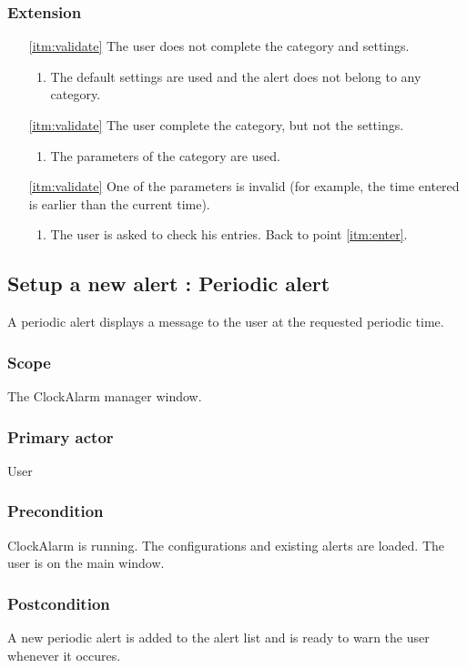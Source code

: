 \subsubsection{Extension}
\begin{enumerate}
	\item[\ref{itm:validate}] The user does not complete the category and settings.
	\begin{enumerate}[i]
		\item The default settings are used and the alert does not belong to any category.
	\end{enumerate}
	\item[\ref{itm:validate}] The user complete the category, but not the settings.
	\begin{enumerate}[i]
		\item The parameters of the category are used.
	\end{enumerate}
	\item[\ref{itm:validate}] One of the parameters is invalid (for example, the time entered is earlier than the current time).
	\begin{enumerate}[i]
		\item The user is asked to check his entries. Back to point \ref{itm:enter}.
	\end{enumerate}
\end{enumerate}

\subsection{Setup a new alert : Periodic alert}
A periodic alert displays a message to the user at the requested periodic time.
\subsubsection{Scope}
The ClockAlarm manager window.
\subsubsection{Primary actor}
User
\subsubsection{Precondition}
ClockAlarm is running. The configurations and existing alerts are loaded. The user is on the main window.
\subsubsection{Postcondition}
A new periodic alert is added to the alert list and is ready to warn the user whenever it occures.
